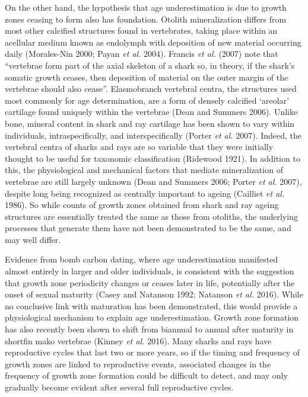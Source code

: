 \documentclass[]{article}
\begin{document}
On the other hand, the hypothesis that age underestimation is due to
growth zones ceasing to form also has foundation. Otolith mineralization
differs from most other calcified structures found in vertebrates,
taking place within an acellular medium known as endolymph with
deposition of new material occurring daily (Morales-Nin 2000; Payan
\emph{et al.} 2004). Francis \emph{et al.} (2007) note that ``vertebrae
form part of the axial skeleton of a shark so, in theory, if the shark's
somatic growth ceases, then deposition of material on the outer margin
of the vertebrae should also cease''. Elasmobranch vertebral centra, the
structures used most commonly for age determination, are a form of
densely calcified `areolar' cartilage found uniquely within the
vertebrae (Dean and Summers 2006). Unlike bone, mineral content in shark
and ray cartilage has been shown to vary within individuals,
intraspecifically, and interspecifically (Porter \emph{et al.} 2007).
Indeed, the vertebral centra of sharks and rays are so variable that
they were initially thought to be useful for taxonomic classification
(Ridewood 1921). In addition to this, the physiological and mechanical
factors that mediate mineralization of vertebrae are still largely
unknown (Dean and Summers 2006; Porter \emph{et al.} 2007), despite long
being recognized as centrally important to ageing (Cailliet \emph{et
al.} 1986). So while counts of growth zones obtained from shark and ray
ageing structures are essentially treated the same as those from
otoliths, the underlying processes that generate them have not been
demonstrated to be the same, and may well differ.

Evidence from bomb carbon dating, where age underestimation manifested
almost entirely in larger and older individuals, is consistent with the
suggestion that growth zone periodicity changes or ceases later in life,
potentially after the onset of sexual maturity (Casey and Natanson 1992;
Natanson \emph{et al.} 2016). While no conclusive link with maturation
has been demonstrated, this would provide a physiological mechanism to
explain age underestimation. Growth zone formation has also recently
been shown to shift from biannual to annual after maturity in shortfin
mako vertebrae (Kinney \emph{et al.} 2016). Many sharks and rays have
reproductive cycles that last two or more years, so if the timing and
frequency of growth zones are linked to reproductive events, associated
changes in the frequency of growth zone formation could be difficult to
detect, and may only gradually become evident after several full
reproductive cycles.
\end{document}
